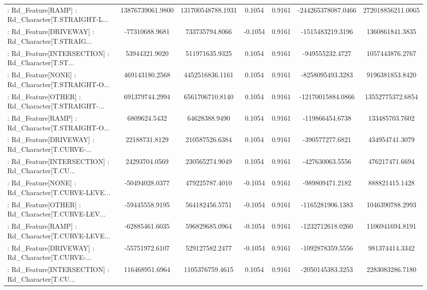 \begin{longtable}{p{4cm}cccccc}
 : Rd\_Feature[RAMP] : Rd\_Character[T.STRAIGHT-L... &  13876739061.9800 & 131700548788.1931 &  0.1054 &       0.9161 & -244265378087.0466 & 272018856211.0065 \\
 : Rd\_Feature[DRIVEWAY] : Rd\_Character[T.STRAIG... &    -77310688.9681 &    733735794.8066 & -0.1054 &       0.9161 &   -1515483219.3196 &   1360861841.3835 \\
 : Rd\_Feature[INTERSECTION] : Rd\_Character[T.ST... &     53944321.9020 &    511971635.9325 &  0.1054 &       0.9161 &    -949555232.4727 &   1057443876.2767 \\
 : Rd\_Feature[NONE] : Rd\_Character[T.STRAIGHT-O... &    469143180.2568 &   4452516836.1161 &  0.1054 &       0.9161 &   -8258095493.3283 &   9196381853.8420 \\
 : Rd\_Feature[OTHER] : Rd\_Character[T.STRAIGHT-... &    691379744.2994 &   6561706710.8140 &  0.1054 &       0.9161 &  -12170015884.0866 &  13552775372.6854 \\
 : Rd\_Feature[RAMP] : Rd\_Character[T.STRAIGHT-O... &      6809624.5432 &     64628388.9490 &  0.1054 &       0.9161 &    -119866454.6738 &    133485703.7602 \\
 : Rd\_Feature[DRIVEWAY] : Rd\_Character[T.CURVE-... &     22188731.8129 &    210587526.6384 &  0.1054 &       0.9161 &    -390577277.6821 &    434954741.3079 \\
 : Rd\_Feature[INTERSECTION] : Rd\_Character[T.CU... &     24293704.0569 &    230565274.9049 &  0.1054 &       0.9161 &    -427630063.5556 &    476217471.6694 \\
 : Rd\_Feature[NONE] : Rd\_Character[T.CURVE-LEVE... &    -50494028.0377 &    479225787.4010 & -0.1054 &       0.9161 &    -989809471.2182 &    888821415.1428 \\
 : Rd\_Feature[OTHER] : Rd\_Character[T.CURVE-LEV... &    -59445558.9195 &    564182456.5751 & -0.1054 &       0.9161 &   -1165281906.1383 &   1046390788.2993 \\
 : Rd\_Feature[RAMP] : Rd\_Character[T.CURVE-LEVE... &    -62885461.6035 &    596829685.0964 & -0.1054 &       0.9161 &   -1232712618.0260 &   1106941694.8191 \\
 : Rd\_Feature[DRIVEWAY] : Rd\_Character[T.CURVE-... &    -55751972.6107 &    529127582.2477 & -0.1054 &       0.9161 &   -1092878359.5556 &    981374414.3342 \\
 : Rd\_Feature[INTERSECTION] : Rd\_Character[T.CU... &    116468951.6964 &   1105376759.4615 &  0.1054 &       0.9161 &   -2050145383.3253 &   2283083286.7180 \\

\end{longtable}
